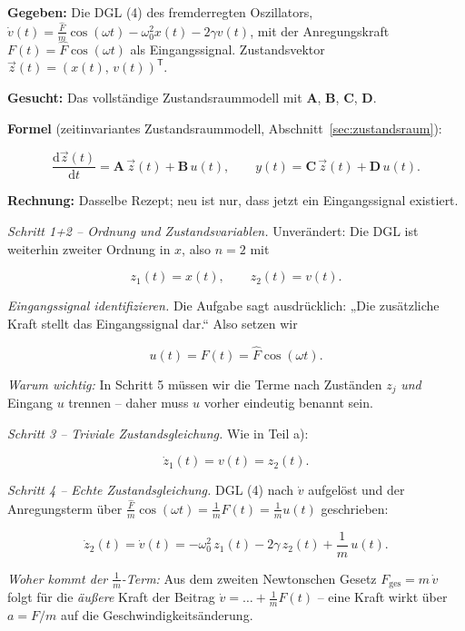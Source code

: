 \begin{beispiel}

\textbf{Gegeben:} Die DGL (4) des fremderregten Oszillators,
$\dot{v}(t) = \tfrac{\hat{F}}{m}\cos(\omega t) - \omega_0^2 x(t) - 2\gamma v(t)$,
mit der Anregungskraft $F(t) = \hat{F}\cos(\omega t)$ als Eingangssignal.
Zustandsvektor $\vec{z}(t) = (x(t),\, v(t))^{\mathsf{T}}$.

\textbf{Gesucht:} Das vollständige Zustandsraummodell mit $\mathbf{A}$,
$\mathbf{B}$, $\mathbf{C}$, $\mathbf{D}$.

\textbf{Formel} (zeitinvariantes Zustandsraummodell,
Abschnitt~\ref{sec:zustandsraum}):

$$
\frac{\mathrm{d}\vec{z}(t)}{\mathrm{d}t} = \mathbf{A}\,\vec{z}(t) + \mathbf{B}\,u(t),
\qquad
y(t) = \mathbf{C}\,\vec{z}(t) + \mathbf{D}\,u(t).
$$

\textbf{Rechnung:} Dasselbe Rezept; neu ist nur, dass jetzt ein Eingangssignal
existiert.

\medskip
\textit{Schritt 1+2 – Ordnung und Zustandsvariablen.}
Unverändert: Die DGL ist weiterhin zweiter Ordnung in $x$, also $n = 2$ mit

$$
z_1(t) = x(t), \qquad z_2(t) = v(t).
$$

\medskip
\textit{Eingangssignal identifizieren.}
Die Aufgabe sagt ausdrücklich: „Die zusätzliche Kraft stellt das Eingangssignal
dar.`` Also setzen wir

$$
u(t) = F(t) = \hat{F}\cos(\omega t).
$$

\emph{Warum wichtig:} In Schritt 5 müssen wir die Terme nach Zuständen $z_j$
\emph{und} Eingang $u$ trennen -- daher muss $u$ vorher eindeutig benannt sein.

\medskip
\textit{Schritt 3 – Triviale Zustandsgleichung.}
Wie in Teil a):

$$
\dot{z}_1(t) = v(t) = z_2(t).
$$

\medskip
\textit{Schritt 4 – Echte Zustandsgleichung.}
DGL (4) nach $\dot{v}$ aufgelöst und der Anregungsterm über
$\tfrac{\hat{F}}{m}\cos(\omega t) = \tfrac{1}{m}F(t) = \tfrac{1}{m}u(t)$
geschrieben:

$$
\dot{z}_2(t) = \dot{v}(t)
= -\omega_0^2\, z_1(t) - 2\gamma\, z_2(t) + \frac{1}{m}\,u(t).
$$

\emph{Woher kommt der $\tfrac{1}{m}$-Term:} Aus dem zweiten Newtonschen Gesetz
$F_{\text{ges}} = m\,\dot{v}$ folgt für die \emph{äußere} Kraft der Beitrag
$\dot{v} = \ldots + \tfrac{1}{m}F(t)$ -- eine Kraft wirkt über $a = F/m$ auf die
Geschwindigkeitsänderung.


\end{beispiel}
